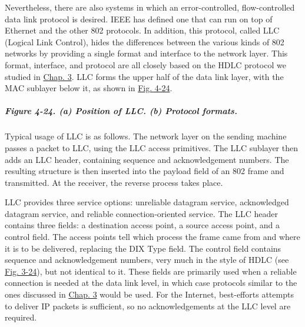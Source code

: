 Nevertheless, there are also systems in which an error-controlled,
flow-controlled data link protocol is desired. IEEE has defined one that
can run on top of Ethernet and the other 802 protocols. In addition,
this protocol, called {LLC} ({Logical Link Control}), hides the
differences between the various kinds of 802 networks by providing a
single format and interface to the network layer. This format,
interface, and protocol are all closely based on the HDLC protocol we
studied in \protect\hyperlink{0130661023_ch03.htmlux5cux23ch03}{Chap.
3}. LLC forms the upper half of the data link layer, with the MAC
sublayer below it, as shown in
\protect\hyperlink{0130661023_ch04lev1sec3.htmlux5cux23ch04fig24}{Fig.
4-24}.

\subparagraph[Figure 4-24. (a) Position of LLC. (b) Protocol
formats.]{\texorpdfstring{\protect\hypertarget{0130661023_ch04lev1sec3.htmlux5cux23ch04fig24}{}{}Figure
4-24. (a) Position of LLC. (b) Protocol
formats.}{Figure 4-24. (a) Position of LLC. (b) Protocol formats.}}


Typical usage of LLC is as follows. The network layer on the sending
machine passes a packet to LLC, using the LLC access primitives. The LLC
sublayer then adds an LLC header, containing sequence and
acknowledgement numbers. The resulting structure is then inserted into
the payload field of an 802 frame and transmitted. At the receiver, the
reverse process takes place.

LLC provides three service options: unreliable datagram service,
acknowledged datagram service, and reliable connection-oriented service.
The LLC header contains three fields: a destination access point, a
source access point, and a control field. The access points tell which
process the frame came from and where it is to be delivered, replacing
the DIX {Type} field. The control field contains sequence and
acknowledgement numbers, very much in the style of HDLC (see
\protect\hyperlink{0130661023_ch03lev1sec6.htmlux5cux23ch03fig24}{Fig.
3-24}), but not identical to it. These fields are primarily used when a
reliable connection is needed at the data link level, in which case
protocols similar to the ones discussed in
\protect\hyperlink{0130661023_ch03.htmlux5cux23ch03}{Chap. 3} would be
used. For the Internet, best-efforts attempts to deliver IP packets is
sufficient, so no acknowledgements at the LLC level are required.

\protect\hypertarget{0130661023_ch04lev1sec3.htmlux5cux23ch04lev2sec18}{}{}

